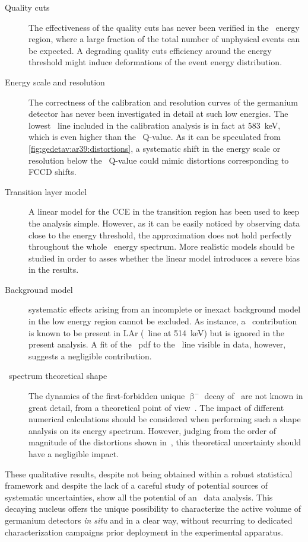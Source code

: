 \begin{description}
  \item[Quality cuts] The effectiveness of the quality cuts has never been verified in the
    \Arl\ energy region, where a large fraction of the total number of unphysical events
    can be expected. A degrading quality cuts efficiency around the energy threshold might
    induce deformations of the event energy distribution.
  \item[Energy scale and resolution] The correctness of the calibration and resolution
    curves of the germanium detector has never been investigated in detail at such low
    energies. The lowest \g\ line included in the calibration analysis is in fact at
    583~keV, which is even higher than the \Arl\ Q-value. As it can be speculated from
    \cref{fig:gedetav:ar39:distortions}, a systematic shift in the energy scale or
    resolution below the \Arl\ Q-value could mimic distortions corresponding to FCCD
    shifts.
  \item[Transition layer model] A linear model for the CCE in the transition region has
    been used to keep the analysis simple. However, as it can be easily noticed by
    observing data close to the energy threshold, the approximation does not hold
    perfectly throughout the whole \Arl\ energy spectrum. More realistic models should be
    studied in order to asses whether the linear model introduces a severe bias in the
    results.
  \item[Background model] systematic effects arising from an incomplete or inexact
    background model in the low energy region cannot be excluded. As instance, a \Kr\
    contribution is known to be present in LAr (\g\ line at 514~keV) but is ignored in the
    present analysis. A fit of the \Kr\ pdf to the \g\ line visible in data, however,
    suggests a negligible contribution.
  \item[\Arl\ spectrum theoretical shape] The dynamics of the first-forbidden unique
    $\upbeta^-$ decay of \Arl\ are not known in great detail, from a theoretical point of
    view~\cite{Kostensalo2017}. The impact of different numerical calculations should be
    considered when performing such a shape analysis on its energy spectrum. However,
    judging from the order of magnitude of the distortions shown in~\cite{Kostensalo2017},
    this theoretical uncertainty should have a negligible impact.
\end{description}

These qualitative results, despite not being obtained within a robust statistical
framework and despite the lack of a careful study of potential sources of systematic
uncertainties, show all the potential of an \Arl\ data analysis. This decaying nucleus
offers the unique possibility to characterize the active volume of germanium detectors
\emph{in situ} and in a clear way, without recurring to dedicated characterization
campaigns prior deployment in the experimental apparatus.


